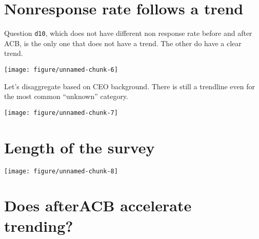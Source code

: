 \documentclass{article}\usepackage[]{graphicx}\usepackage[]{color}
\makeatletter
\def\maxwidth{ %
  \ifdim\Gin@nat@width>\linewidth
    \linewidth
  \else
    \Gin@nat@width
  \fi
}
\newenvironment{kframe}{%
 \def\at@end@of@kframe{}%
 \ifinner\ifhmode%
  \def\at@end@of@kframe{\end{minipage}}%
  \begin{minipage}{\columnwidth}%
 \fi\fi%
 \def\FrameCommand##1{\hskip\@totalleftmargin \hskip-\fboxsep
 \colorbox{shadecolor}{##1}\hskip-\fboxsep
     \hskip-\linewidth \hskip-\@totalleftmargin \hskip\columnwidth}%
 \MakeFramed {\advance\hsize-\width
   \@totalleftmargin\z@ \linewidth\hsize
   \@setminipage}}%
 {\par\unskip\endMakeFramed%
 \at@end@of@kframe}
\newenvironment{knitrout}{}{} %
\makeatother
\begin{document}
\section{Nonresponse rate follows a trend}

Question \verb`d10`, which does not have different non response rate before and after ACB, is the only one that does not have a trend. The other do have a clear trend.

\begin{knitrout}
\color{fgcolor}

{\centering \texttt{[image: figure/unnamed-chunk-6]} 

}



\end{knitrout}

Let's disaggregate based on CEO background. There is still a trendline even for the most common ``unknown'' category.

\begin{knitrout}
\color{fgcolor}

{\centering \texttt{[image: figure/unnamed-chunk-7]} 

}



\end{knitrout}

\section{Length of the survey}

\begin{knitrout}
\color{fgcolor}\begin{kframe}


{\ttfamily\noindent\color{warningcolor}{\#\# Warning: attributes are not identical across measure variables; they will be dropped}}\end{kframe}

{\centering \texttt{[image: figure/unnamed-chunk-8]} 

}



\end{knitrout}

\section{Does afterACB accelerate trending?}
\end{document}
